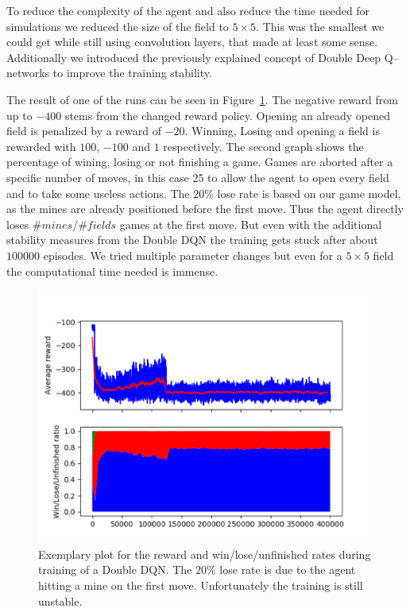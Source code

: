 To reduce the complexity of the agent and also reduce the time needed for simulations we reduced the size of the field to $5 \times 5$.
This was the smallest we could get while still using convolution layers, that made at least some sense.
Additionally we introduced the previously explained concept of Double Deep Q--networks to improve the training stability.

The result of one of the runs can be seen in Figure~\ref*{fig:DDQN_still_unstable}.
The negative reward from up to $-400$ stems from the changed reward policy.
Opening an already opened field is penalized by a reward of $-20$.
Winning, Losing and opening a field is rewarded with $100$, $-100$ and $1$ respectively.
The second graph shows the percentage of wining, losing or not finishing a game.
Games are aborted after a specific number of moves, in this case 25 to allow the agent to open every field and to take some useless actions.
The $20\%$ lose rate is based on our game model, as the mines are already positioned before the first move.
Thus the agent directly loses $\#mines/\#fields$ games at the first move.
But even with the additional stability measures from the Double DQN the training gets stuck after about $100000$ episodes.
We tried multiple parameter changes but even for a $5 \times 5$ field the computational time needed is immense.

\begin{figure}
	\centering
	\includegraphics[width=\textwidth]{images/CNN-2nd-Plot.png}
	\caption{Exemplary plot for the reward and win/lose/unfinished rates during training of a Double DQN. The $20\%$ lose rate is due to the agent hitting a mine on the first move. Unfortunately the training is still unstable.}
	\label{fig:DDQN_still_unstable}
\end{figure}


